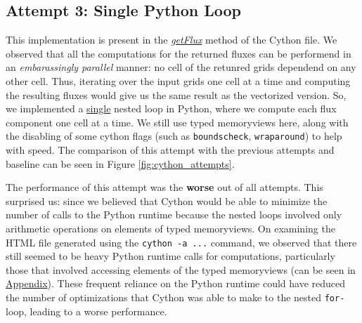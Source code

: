 \documentclass[a4paper,10pt]{article}
\begin{document}
    

\subsection{Attempt 3: Single \textbf{Python} Loop}
This implementation is present in the \href{https://github.com/paulmyr/DD2358-HPC25/blob/master/10_project_rishi_paul/code/cython/finitevolume_cython_lib.pyx#L287}{\textit{getFlux}} method of the Cython file. We observed that all the computations for the returned fluxes can be performend in an \textit{embarassingly parallel} manner: no cell of the retunred grids dependend on any other cell. Thus, iterating over the input grids one cell at a time and computing the resulting fluxes would give us the same result as the vectorized version. So, we implemented a \underline{single} nested loop in Python, where we compute each flux component one cell at a time. We still use typed memoryviews here, along with the disabling of some cython flags (such as \verb|boundscheck|, \verb|wraparound|) to help with speed. The comparison of this attempt with the previous attempts and baseline can be seen in Figure \ref{fig:cython_attempts}. 

The performance of this attempt was the \textbf{worse} out of all attempts. This surprised us: since we believed that Cython would be able to minimize the number of calls to the Python runtime because the nested loops involved only arithmetic operations on elements of typed memoryviews. On examining the HTML file generated using the \verb|cython -a ...| command, we observed that there still seemed to be heavy Python runtime calls for computations, particularly those that involved accessing elements of the typed memoryviews (can be seen in \hyperref[fig:cython_attempt_3_annotated]{Appendix}). These frequent reliance on the Python runtime could have reduced the number of optimizations that Cython was able to make to the nested \verb|for-| loop, leading to a worse performance.
\end{document}
